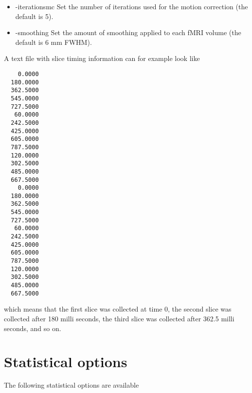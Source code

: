 \begin{itemize}
\item -iterationsmc 
\newline \newline Set the number of iterations used for the \newline motion correction (the default is 5).

\item -smoothing 
\newline \newline Set the amount of smoothing applied to \newline each fMRI volume (the default is 6 mm FWHM). 

\end{itemize}

\newpage

A text file with slice timing information can for example look like
\begin{verbatim}
    0.0000
  180.0000
  362.5000
  545.0000
  727.5000
   60.0000
  242.5000
  425.0000
  605.0000
  787.5000
  120.0000
  302.5000
  485.0000
  667.5000
    0.0000
  180.0000
  362.5000
  545.0000
  727.5000
   60.0000
  242.5000
  425.0000
  605.0000
  787.5000
  120.0000
  302.5000
  485.0000
  667.5000
\end{verbatim}

which means that the first slice was collected at time 0, the second slice was collected after 180 milli seconds, the third slice was collected after 362.5 milli seconds, and so on.

\newpage


\section{Statistical options}

The following statistical options are available

